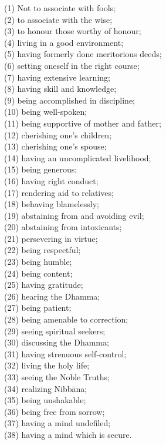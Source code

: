 (1) Not to associate with fools;\\
(2) to associate with the wise;\\
(3) to honour those worthy of honour;\\
(4) living in a good environment;\\
(5) having formerly done meritorious deeds;\\
(6) setting oneself in the right course;\\
(7) having extensive learning;\\
(8) having skill and knowledge;\\
(9) being accomplished in discipline;\\
(10) being well-spoken;\\
(11) being supportive of mother and father;\\
(12) cherishing one's children;\\
(13) cherishing one's spouse;\\
(14) having an uncomplicated livelihood;\\
(15) being generous;\\
(16) having right conduct;\\
(17) rendering aid to relatives;\\
(18) behaving blamelessly;\\
(19) abstaining from and avoiding evil;\\
(20) abstaining from intoxicants;\\
(21) persevering in virtue;\\
(22) being respectful;\\
(23) being humble;\\
(24) being content;\\
(25) having gratitude;\\
(26) hearing the Dhamma;\\
(27) being patient;\\
(28) being amenable to correction;\\
(29) seeing spiritual seekers;\\
(30) discussing the Dhamma;\\
(31) having strenuous self-control;\\
(32) living the holy life;\\
(33) seeing the Noble Truths;\\
(34) realizing Nibbāna;\\
(35) being unshakable;\\
(36) being free from sorrow;\\
(37) having a mind undefiled;\\
(38) having a mind which is secure.

